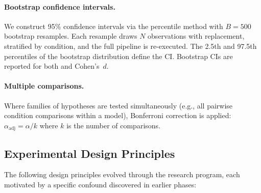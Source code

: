\paragraph{Bootstrap confidence intervals.}
We construct 95\% confidence intervals via the percentile method with $B = 500$ bootstrap resamples.
Each resample draws $N$ observations with replacement, stratified by condition, and the full pipeline is re-executed.
The 2.5th and 97.5th percentiles of the bootstrap distribution define the CI.
Bootstrap CIs are reported for both \auroc and Cohen's~$d$.

\paragraph{Multiple comparisons.}
Where families of hypotheses are tested simultaneously (e.g., all pairwise condition comparisons within a model), Bonferroni correction is applied: $\alpha_{\mathrm{adj}} = \alpha / k$ where $k$ is the number of comparisons.

\subsection{Experimental Design Principles}
\label{sec:design-principles}

The following design principles evolved through the research program, each motivated by a specific confound discovered in earlier phases:

